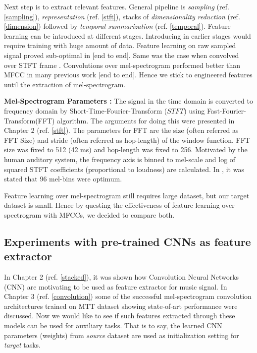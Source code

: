 \noindent Next step is to extract relevant features. General pipeline is \textit{sampling} (ref. \ref{sampling}), \textit{representation} (ref. \ref{stft}), stacks of \textit{dimensionality reduction} (ref. \ref{dimension}) followed by \textit{temporal summarization} (ref. \ref{temporal}). Feature learning can be introduced at different stages. Introducing in earlier stages would require training with huge amount of data. Feature learning on raw sampled signal proved sub-optimal in [end to end]. Same was the case when convolved over STFT frame \cite{choi_cnn}. Convolutions over mel-spectrogram performed better than MFCC in many previous work \cite{choi_cnn}[end to end]. Hence we stick to engineered features until the extraction of mel-spectrogram.  
\bigskip 

\noindent \textbf{Mel-Spectrogram Parameters :}
The signal in the time domain is converted to frequency domain by Short-Time-Fourier-Transform ($STFT$) using Fast-Fourier-Transform(FFT) algorithm. The arguments for doing this were presented in Chapter 2 (ref. \ref{stft}). The parameters for FFT are the size (often referred as FFT Size) and stride (often referred as hop-length) of the window function. FFT size was fixed to 512 (42 ms) and hop-length was fixed to 256. Motivated by the human auditory system, the frequency axis is binned to mel-scale and log of squared STFT coefficients (proportional to loudness) are calculated. In \cite{choi_cnn}, it was stated that 96 mel-bins were optimum.   
\bigskip

\noindent Feature learning over mel-spectrogram still requires large dataset, but our target dataset is small. Hence by questing the effectiveness of feature learning over spectrogram with MFCCs, we decided  to compare both.
\bigskip

\subsection{Experiments with pre-trained CNNs as feature extractor}
\label{pretrained}
In Chapter 2 (ref. \ref{stacked}), it was shown how Convolution Neural Networks (CNN) are motivating to be used as feature extractor for music signal. In Chapter 3 (ref. \ref{convolution}) some of the successful mel-spectrogram convolution architectures trained on MTT dataset showing state-of-art performance were discussed. Now we would like to see if such features extracted through these models can be used for auxiliary tasks. That is to say, the learned CNN parameters (weights) from \textit{source} dataset are used as initialization setting for \textit{target} tasks.    
\bigskip

